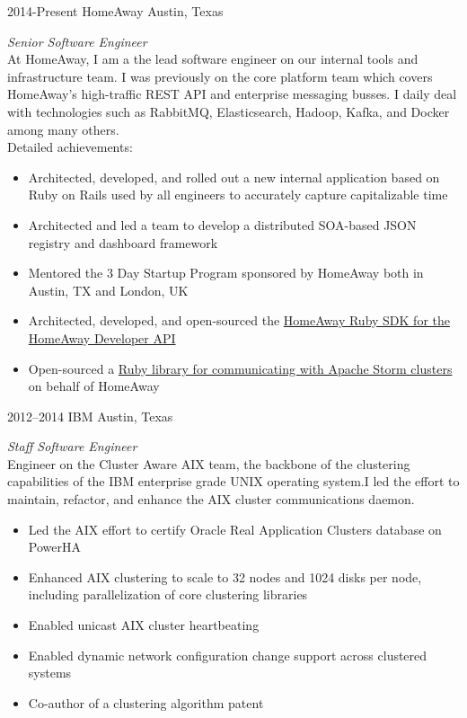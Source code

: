 \documentclass{friggeri-cv} %
\begin{document}
\begin{entrylist}
\entry
{2014-Present}
{HomeAway}
{Austin, Texas}
{\emph{Senior Software Engineer} \\
At HomeAway, I am a the lead software engineer on our internal tools and infrastructure team. I was previously on the core platform team which covers HomeAway's high-traffic REST API and enterprise messaging busses. I daily deal with technologies such as RabbitMQ, Elasticsearch, Hadoop, Kafka, and Docker among many others. \\
Detailed achievements:
\begin{itemize}
\item Architected, developed, and rolled out a new internal application based on Ruby on Rails used by all engineers to accurately capture capitalizable time
\item Architected and led a team to develop a distributed SOA-based JSON registry and dashboard framework
\item Mentored the 3 Day Startup Program sponsored by HomeAway both in Austin, TX and London, UK
\item Architected, developed, and open-sourced the \href{https://github.com/homeaway/homeaway_api_ruby}{HomeAway Ruby SDK for the HomeAway Developer API}
\item Open-sourced a \href{https://github.com/homeaway/homeaway-storm}{Ruby library for communicating with Apache Storm clusters} on behalf of HomeAway
\end{itemize}}
\end{entrylist}
\begin{entrylist}
\entry
{2012--2014}
{IBM}
{Austin, Texas}
{\emph{Staff Software Engineer} \\
Engineer on the Cluster Aware AIX team, the backbone of the clustering capabilities of the IBM enterprise grade UNIX operating system.I led the effort to maintain, refactor, and enhance the AIX cluster communications daemon. \\
\begin{itemize}
\item Led the AIX effort to certify Oracle Real Application Clusters database on PowerHA
\item Enhanced AIX clustering to scale to 32 nodes and 1024 disks per node, including parallelization of core clustering libraries
\item Enabled unicast AIX cluster heartbeating
\item Enabled dynamic network configuration change support across clustered systems
\item Co-author of a clustering algorithm patent 
\end{itemize}}
\end{entrylist}
\end{document}
